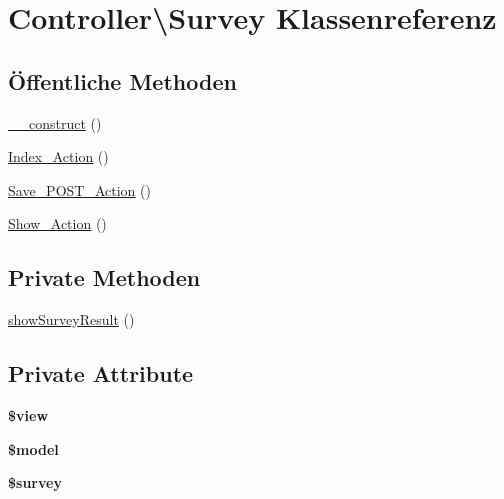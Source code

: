 \hypertarget{class_controller_1_1_survey}{\section{Controller\textbackslash{}Survey Klassenreferenz}
\label{class_controller_1_1_survey}
}
\subsection*{Öffentliche Methoden}
\begin{DoxyCompactItemize}
\item 
\hyperlink{class_controller_1_1_survey_a96fc5091aa3b11390854987ecf667f15}{\-\_\-\-\_\-construct} ()
\item 
\hyperlink{class_controller_1_1_survey_ab9a687bf4e1fe3c36b13ff873e94b212}{Index\-\_\-\-Action} ()
\item 
\hyperlink{class_controller_1_1_survey_a1a671d9a36a993bab69c12c16fcc60cc}{Save\-\_\-\-P\-O\-S\-T\-\_\-\-Action} ()
\item 
\hyperlink{class_controller_1_1_survey_a6d7373346ea75a9c0f9672fcd54ea4d9}{Show\-\_\-\-Action} ()
\end{DoxyCompactItemize}
\subsection*{Private Methoden}
\begin{DoxyCompactItemize}
\item 
\hyperlink{class_controller_1_1_survey_a623581300b3866aaad9ed74511913544}{show\-Survey\-Result} ()
\end{DoxyCompactItemize}
\subsection*{Private Attribute}
\begin{DoxyCompactItemize}
\item 
\hypertarget{class_controller_1_1_survey_af4dfeefe4184d06ce16596852d1699fe}{{\bfseries \$view}}\label{class_controller_1_1_survey_af4dfeefe4184d06ce16596852d1699fe}

\item 
\hypertarget{class_controller_1_1_survey_aaf7d79f033911a2dccb8a9b86335f608}{{\bfseries \$model}}\label{class_controller_1_1_survey_aaf7d79f033911a2dccb8a9b86335f608}

\item 
\hypertarget{class_controller_1_1_survey_a5dbe38a79e94073188649d98023be07f}{{\bfseries \$survey}}\label{class_controller_1_1_survey_a5dbe38a79e94073188649d98023be07f}

\end{DoxyCompactItemize}


